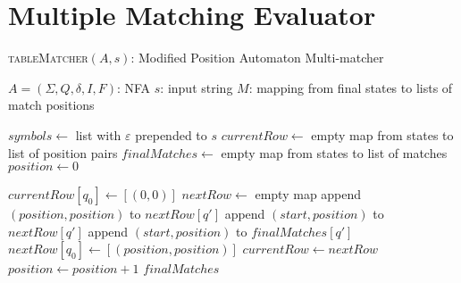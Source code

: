 \chapter{Multiple Matching Evaluator}
\begin{algorithm}
	\caption{\textsc{tableMatcher}$(A, s)$: Modified Position Automaton Multi-matcher}
	\label{alg:table-matcher}
	\begin{small}
		\begin{algorithmic}[1]
			\Require $A = (\Sigma, Q, \delta, I, F)$: NFA
			\Require $s$: input string
			\Ensure $M$: mapping from final states to lists of match positions
			
			\State $symbols \gets$ list with $\varepsilon$ prepended to $s$
			\State $currentRow \gets$ empty map from states to list of position pairs
			\State $finalMatches \gets$ empty map from states to list of matches
			\State $position \gets 0$
			
			\State $currentRow[q_0] \gets [(0, 0)]$
			\EndFor
			\Else
			\State $nextRow \gets$ empty map
			\State append $(position, position)$ to $nextRow[q']$
			\Else
			\State append $(start, position)$ to $nextRow[q']$
			\State append $(start, position)$ to $finalMatches[q']$
			\EndIf
			\EndIf
			\EndFor
			\EndFor
			\EndIf
			\EndFor
			\Else
			\State $nextRow[q_0] \gets [(position, position)]$
			\EndFor
			\EndIf
			\State $currentRow \gets nextRow$
			\State $position \gets position + 1$
			\EndIf
			\EndFor
			\State \Return $finalMatches$
		\end{algorithmic}
	\end{small}
\end{algorithm}

